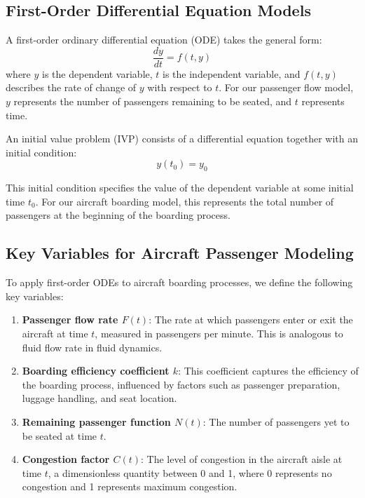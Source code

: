 \documentclass[12pt,a4paper]{article}
\begin{document}
\subsection{First-Order Differential Equation Models}
A first-order ordinary differential equation (ODE) takes the general form:
\begin{equation}
\frac{dy}{dt} = f(t, y)
\label{eq:first_order_ode}
\end{equation}
where $y$ is the dependent variable, $t$ is the independent variable, and $f(t, y)$ describes the rate of change of $y$ with respect to $t$. For our passenger flow model, $y$ represents the number of passengers remaining to be seated, and $t$ represents time.

An initial value problem (IVP) consists of a differential equation together with an initial condition:
\begin{equation}
y(t_0) = y_0
\label{eq:ivp}
\end{equation}

This initial condition specifies the value of the dependent variable at some initial time $t_0$. For our aircraft boarding model, this represents the total number of passengers at the beginning of the boarding process.

\subsection{Key Variables for Aircraft Passenger Modeling}
To apply first-order ODEs to aircraft boarding processes, we define the following key variables:

\begin{enumerate}
\item \textbf{Passenger flow rate $F(t)$}: The rate at which passengers enter or exit the aircraft at time $t$, measured in passengers per minute. This is analogous to fluid flow rate in fluid dynamics.

\item \textbf{Boarding efficiency coefficient $k$}: This coefficient captures the efficiency of the boarding process, influenced by factors such as passenger preparation, luggage handling, and seat location.

\item \textbf{Remaining passenger function $N(t)$}: The number of passengers yet to be seated at time $t$.

\item \textbf{Congestion factor $C(t)$}: The level of congestion in the aircraft aisle at time $t$, a dimensionless quantity between 0 and 1, where 0 represents no congestion and 1 represents maximum congestion.
\end{enumerate}
\end{document}
